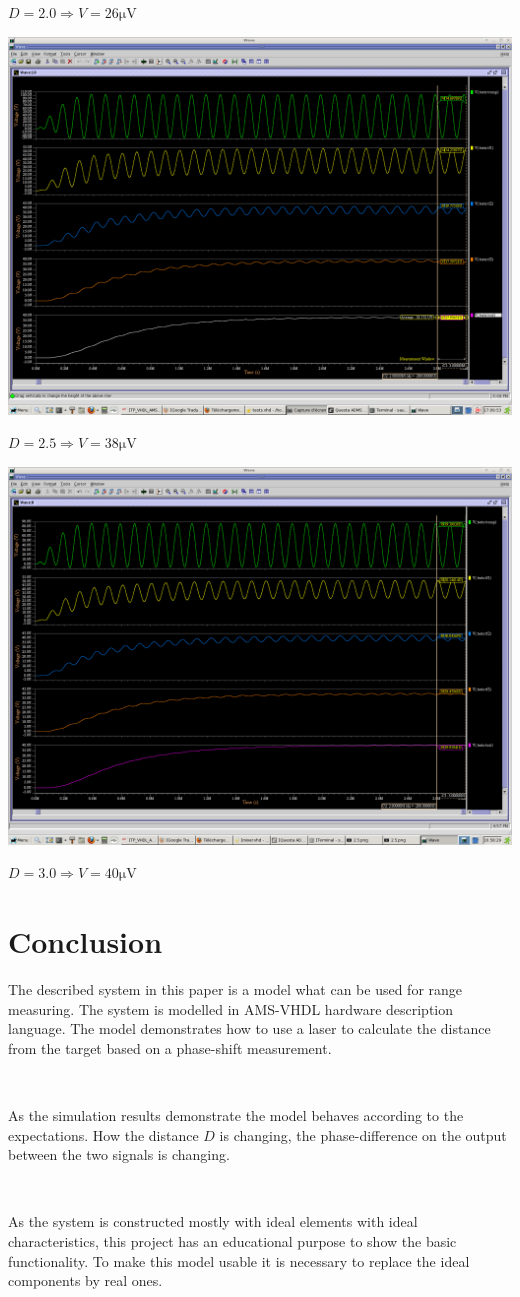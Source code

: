 \documentclass[fleqn]{article}
\begin{document}
$D=2.0\Rightarrow V=26\si{\micro\volt}$
\newpage

\includegraphics[width=\linewidth]{2.5.png}

$D=2.5\Rightarrow V=38\si{\micro\volt}$
\newpage

\includegraphics[width=\linewidth]{3.0.png}

$D=3.0\Rightarrow V=40\si{\micro\volt}$
\newpage
\section{Conclusion}

The described system in this paper is a model what can be used for range measuring. The system is modelled in AMS-VHDL hardware description language. The model demonstrates how to use a laser to calculate the distance from the target based on a phase-shift measurement.

~

As the simulation results demonstrate the model behaves according to the expectations. How the distance $D$ is changing, the phase-difference on the output between the two signals is changing.

~

As the system is constructed mostly with ideal elements with ideal characteristics, this project has an educational purpose to show the basic functionality. To make this model usable it is necessary to replace the ideal components by real ones.
\end{document}
